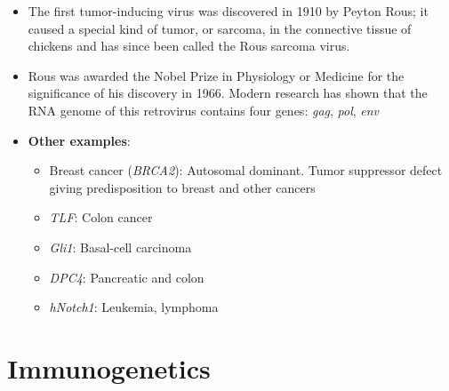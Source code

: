 \documentclass[11pt,dvipsnames,ignorenonframetext,aspectratio=169]{beamer}
\providecommand{\tightlist}{%
  \setlength{\itemsep}{0pt}\setlength{\parskip}{0pt}}
\begin{document}
\begin{frame}{}
\protect\hypertarget{section-12}{}

\begin{itemize}
\tightlist
\item
  The first tumor-inducing virus was discovered in 1910 by Peyton Rous;
  it caused a special kind of tumor, or sarcoma, in the connective
  tissue of chickens and has since been called the Rous sarcoma virus.
\item
  Rous was awarded the Nobel Prize in Physiology or Medicine for the
  significance of his discovery in 1966. Modern research has shown that
  the RNA genome of this retrovirus contains four genes: \emph{gag},
  \emph{pol}, \emph{env}
\item
  \textbf{Other examples}:

  \begin{itemize}
  \tightlist
  \item
    Breast cancer (\emph{BRCA2}): Autosomal dominant. Tumor suppressor
    defect giving predisposition to breast and other cancers
  \item
    \emph{TLF}: Colon cancer
  \item
    \emph{Gli1}: Basal-cell carcinoma
  \item
    \emph{DPC4}: Pancreatic and colon
  \item
    \emph{hNotch1}: Leukemia, lymphoma
  \end{itemize}
\end{itemize}

\end{frame}

\hypertarget{immunogenetics}{%
\section{Immunogenetics}\label{immunogenetics}}
\end{document}
